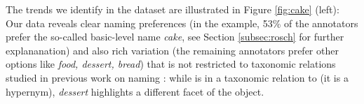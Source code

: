 The trends we identify in the dataset are illustrated in Figure \ref{fig:cake} (left): Our data reveals clear naming preferences (in the example, 53\% of the annotators prefer the so-called basic-level name \textit{cake}, see Section \ref{subsec:rosch} for further explananation) and also rich variation (the remaining annotators prefer other options like \textit{food, dessert, bread}) that is not restricted to taxonomic relations studied in previous work on naming \cite{Ordonez:2016,graf2016animal}: while  is in a taxonomic relation to  (it is a hypernym), \textit{dessert} highlights a different facet of the object.

